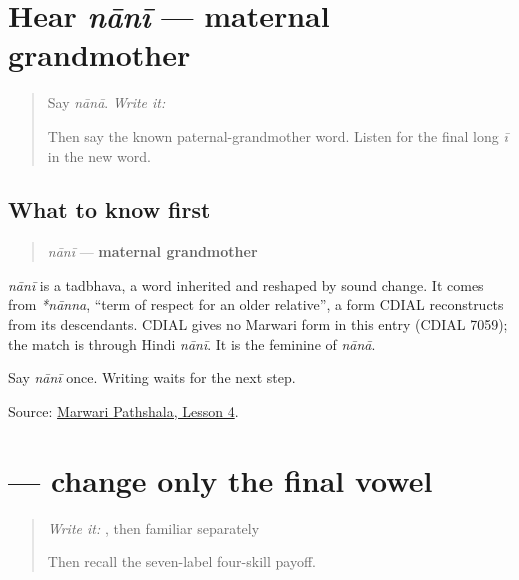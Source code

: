 \section[nānī]{Hear \emph{nānī} — maternal grandmother}

\label{lesson:MW-C09-hear-nani}



\begin{quote}
Say \emph{nānā}. \emph{Write it:} \textbf{}

Then say the known paternal-grandmother word. Listen for the final long \emph{ī} in the new word.
\end{quote}

\subsection*{What to know first}
\begin{quote}
\emph{nānī} — \textbf{maternal grandmother}
\end{quote}

\begin{cousinweb}
\emph{nānī} is a tadbhava, a word inherited and reshaped by sound change. It comes from \emph{*nānna}, \textquotedblleft{}term of respect for an older relative\textquotedblright{}, a form CDIAL reconstructs from its descendants. CDIAL gives no Marwari form in this entry (CDIAL 7059); the match is through Hindi \emph{nānī}. It is the feminine of \emph{nānā}.
\end{cousinweb}

\begin{tcolorbox}[breakable,colback=teal!4,colframe=teal!35!black,title={Before you move on}]
Say \emph{nānī} once. Writing waits for the next step.

Source: \href{https://www.marwaripathshala.com/marwari-lesson-4-english}{Marwari Pathshala, Lesson 4}.
\end{tcolorbox}
\section[\texorpdfstring{\mw{नानी} (nānī)}{नानी (nānī)}]{ — change only the final vowel}

\label{lesson:MW-C09-nani}



\begin{quote}
\emph{Write it:} \textbf{}, then familiar \textbf{} separately

Then recall the seven-label four-skill payoff.
\end{quote}

